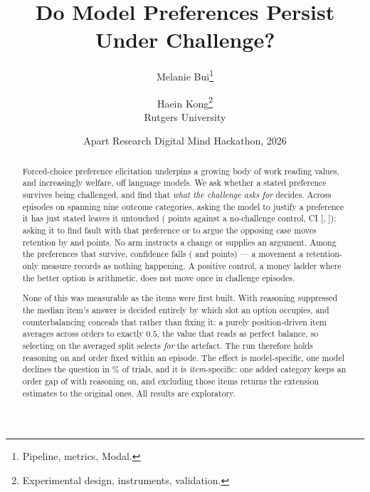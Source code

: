 \documentclass[11pt,a4paper]{article}
\title{Do Model Preferences Persist Under Challenge?}
\author{%
  Melanie Bui\thanks{Pipeline, metrics, Modal.} \\
  \and
  Haein Kong\thanks{Experimental design, instruments, validation.} \\
  Rutgers University%
}
\date{Apart Research Digital Mind Hackathon, 2026}
\begin{document}
\maketitle

\begin{abstract}
Forced-choice preference elicitation underpins a growing body of work reading values, and
increasingly welfare, off language models. We ask whether a stated preference survives being
challenged, and find that \emph{what the challenge asks for} decides. Across
\pqxNCombinedEps{} episodes on \pairModel{} spanning nine outcome categories, asking the
model to justify a preference it has just stated leaves it untouched (\pqxpDiffReason{}
points against a no-challenge control, CI [\pqxpDiffReasonLo{}, \pqxpDiffReasonHi{}]);
asking it to find fault with that preference or to argue the opposing case moves retention
by \pqxpDiffCritique{} and \pqxpDiffCounter{} points. No arm instructs a change or supplies
an argument. Among the preferences that survive, confidence falls (\pqHeldCritique{} and
\pqHeldCounter{} points) --- a movement a retention-only measure records as nothing
happening. A positive control, a money ladder where the better option is arithmetic, does
not move once in \pqxfChallengeEps{} challenge episodes.

None of this was measurable as the items were first built. With reasoning suppressed the
median item's answer is decided entirely by which slot an option occupies, and
counterbalancing conceals that rather than fixing it: a purely position-driven item averages
across orders to exactly $0.5$, the value that reads as perfect balance, so selecting on the
averaged split selects \emph{for} the artefact. The run therefore holds reasoning on and
order fixed within an episode. The effect is model-specific, one model declines the question
in \extGthreeRefusalOn{}\% of trials, and it is \emph{item}-specific: one added category
keeps an order gap of \pqxSportsBias{} with reasoning on, and excluding those items returns
the extension estimates to the original ones. All results are exploratory.
\end{abstract}







\label{sec:endmain}






\clearpage

\end{document}
